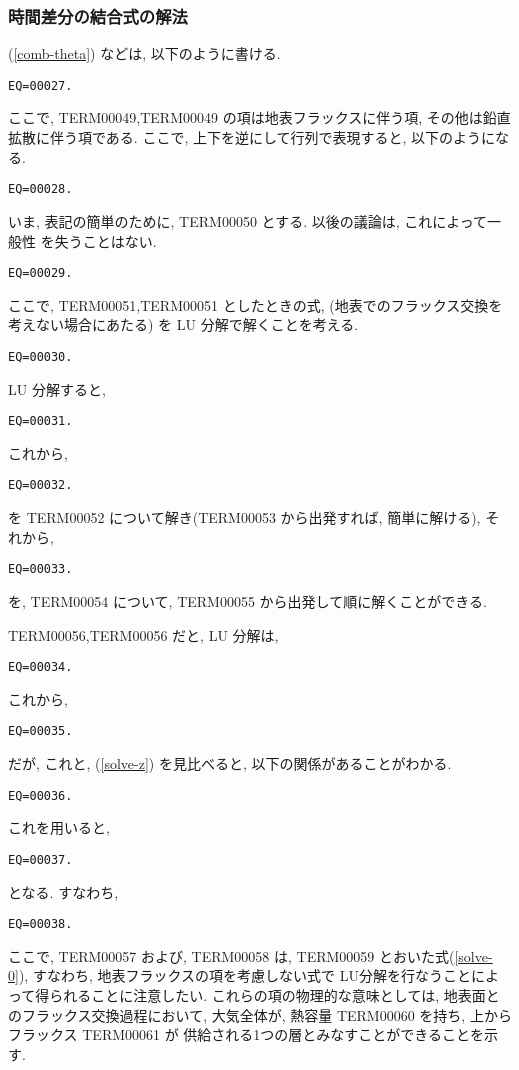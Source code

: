 \subsubsection{時間差分の結合式の解法}

(\ref{comb-theta}) などは, 以下のように書ける.
%
\begin{verbatim}
EQ=00027.
\end{verbatim}
ここで, TERM00049,TERM00049
の項は地表フラックスに伴う項,
その他は鉛直拡散に伴う項である.
%
ここで, 上下を逆にして行列で表現すると, 以下のようになる.
%
\begin{verbatim}
EQ=00028.
\end{verbatim}

いま, 表記の簡単のために, TERM00050 とする.  以後の議論は, これによって一般性
を失うことはない.
%
\begin{verbatim}
EQ=00029.
\end{verbatim}
%
ここで,
TERM00051,TERM00051 としたときの式,
(地表でのフラックス交換を考えない場合にあたる)
を LU 分解で解くことを考える.
%
\begin{verbatim}
EQ=00030.
\end{verbatim}

LU 分解すると,
%
\begin{verbatim}
EQ=00031.
\end{verbatim}
%
これから, 
%
\begin{verbatim}
EQ=00032.
\end{verbatim}
%
を TERM00052 について解き(TERM00053 から出発すれば, 簡単に解ける), 
それから,
%
\begin{verbatim}
EQ=00033.
\end{verbatim}
%
を, TERM00054 について, TERM00055 から出発して順に解くことができる.

TERM00056,TERM00056 だと, LU 分解は, 
%
\begin{verbatim}
EQ=00034.
\end{verbatim}
%
これから, 
%
\begin{verbatim}
EQ=00035.
\end{verbatim}
%
だが, これと, (\ref{solve-z}) を見比べると, 以下の関係があることがわかる.
%
\begin{verbatim}
EQ=00036.
\end{verbatim}
%
これを用いると,
%
\begin{verbatim}
EQ=00037.
\end{verbatim}
%
となる. すなわち,
%
\begin{verbatim}
EQ=00038.
\end{verbatim}
%
ここで, TERM00057 および, TERM00058 は,
TERM00059 とおいた式(\ref{solve-0}),
すなわち, 地表フラックスの項を考慮しない式で
LU分解を行なうことによって得られることに注意したい.
これらの項の物理的な意味としては,
地表面とのフラックス交換過程において,
大気全体が, 熱容量 TERM00060 を持ち, 
上からフラックス TERM00061 が
供給される1つの層とみなすことができることを示す.

